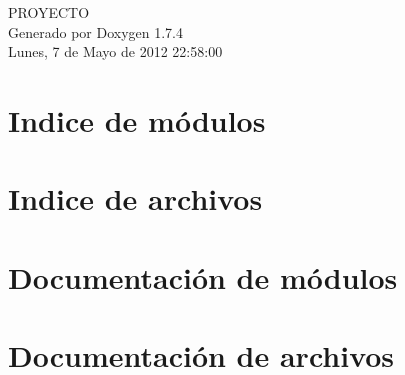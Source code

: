 \documentclass[a4paper]{book}
\begin{document}
\hypersetup{pageanchor=false}
\begin{titlepage}
\vspace*{7cm}
\begin{center}
{\Large PROYECTO }\\
\vspace*{1cm}
{\large Generado por Doxygen 1.7.4}\\
\vspace*{0.5cm}
{\small Lunes, 7 de Mayo de 2012 22:58:00}\\
\end{center}
\end{titlepage}
\clearemptydoublepage
{}
\tableofcontents
\clearemptydoublepage
{}
\hypersetup{pageanchor=true}
\chapter{Indice de módulos}

\chapter{Indice de archivos}

\chapter{Documentación de módulos}





\chapter{Documentación de archivos}

















\printindex
\end{document}
